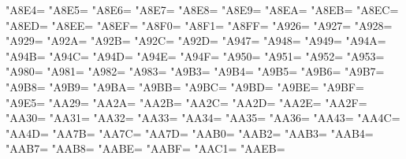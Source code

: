 \XeTeXcharclass"A8E4=\KclassCM
\XeTeXcharclass"A8E5=\KclassCM
\XeTeXcharclass"A8E6=\KclassCM
\XeTeXcharclass"A8E7=\KclassCM
\XeTeXcharclass"A8E8=\KclassCM
\XeTeXcharclass"A8E9=\KclassCM
\XeTeXcharclass"A8EA=\KclassCM
\XeTeXcharclass"A8EB=\KclassCM
\XeTeXcharclass"A8EC=\KclassCM
\XeTeXcharclass"A8ED=\KclassCM
\XeTeXcharclass"A8EE=\KclassCM
\XeTeXcharclass"A8EF=\KclassCM
\XeTeXcharclass"A8F0=\KclassCM
\XeTeXcharclass"A8F1=\KclassCM
\XeTeXcharclass"A8FF=\KclassCM
\XeTeXcharclass"A926=\KclassCM
\XeTeXcharclass"A927=\KclassCM
\XeTeXcharclass"A928=\KclassCM
\XeTeXcharclass"A929=\KclassCM
\XeTeXcharclass"A92A=\KclassCM
\XeTeXcharclass"A92B=\KclassCM
\XeTeXcharclass"A92C=\KclassCM
\XeTeXcharclass"A92D=\KclassCM
\XeTeXcharclass"A947=\KclassCM
\XeTeXcharclass"A948=\KclassCM
\XeTeXcharclass"A949=\KclassCM
\XeTeXcharclass"A94A=\KclassCM
\XeTeXcharclass"A94B=\KclassCM
\XeTeXcharclass"A94C=\KclassCM
\XeTeXcharclass"A94D=\KclassCM
\XeTeXcharclass"A94E=\KclassCM
\XeTeXcharclass"A94F=\KclassCM
\XeTeXcharclass"A950=\KclassCM
\XeTeXcharclass"A951=\KclassCM
\XeTeXcharclass"A952=\KclassCM
\XeTeXcharclass"A953=\KclassCM
\XeTeXcharclass"A980=\KclassCM
\XeTeXcharclass"A981=\KclassCM
\XeTeXcharclass"A982=\KclassCM
\XeTeXcharclass"A983=\KclassCM
\XeTeXcharclass"A9B3=\KclassCM
\XeTeXcharclass"A9B4=\KclassCM
\XeTeXcharclass"A9B5=\KclassCM
\XeTeXcharclass"A9B6=\KclassCM
\XeTeXcharclass"A9B7=\KclassCM
\XeTeXcharclass"A9B8=\KclassCM
\XeTeXcharclass"A9B9=\KclassCM
\XeTeXcharclass"A9BA=\KclassCM
\XeTeXcharclass"A9BB=\KclassCM
\XeTeXcharclass"A9BC=\KclassCM
\XeTeXcharclass"A9BD=\KclassCM
\XeTeXcharclass"A9BE=\KclassCM
\XeTeXcharclass"A9BF=\KclassCM
\XeTeXcharclass"A9E5=\KclassCM
\XeTeXcharclass"AA29=\KclassCM
\XeTeXcharclass"AA2A=\KclassCM
\XeTeXcharclass"AA2B=\KclassCM
\XeTeXcharclass"AA2C=\KclassCM
\XeTeXcharclass"AA2D=\KclassCM
\XeTeXcharclass"AA2E=\KclassCM
\XeTeXcharclass"AA2F=\KclassCM
\XeTeXcharclass"AA30=\KclassCM
\XeTeXcharclass"AA31=\KclassCM
\XeTeXcharclass"AA32=\KclassCM
\XeTeXcharclass"AA33=\KclassCM
\XeTeXcharclass"AA34=\KclassCM
\XeTeXcharclass"AA35=\KclassCM
\XeTeXcharclass"AA36=\KclassCM
\XeTeXcharclass"AA43=\KclassCM
\XeTeXcharclass"AA4C=\KclassCM
\XeTeXcharclass"AA4D=\KclassCM
\XeTeXcharclass"AA7B=\KclassCM
\XeTeXcharclass"AA7C=\KclassCM
\XeTeXcharclass"AA7D=\KclassCM
\XeTeXcharclass"AAB0=\KclassCM
\XeTeXcharclass"AAB2=\KclassCM
\XeTeXcharclass"AAB3=\KclassCM
\XeTeXcharclass"AAB4=\KclassCM
\XeTeXcharclass"AAB7=\KclassCM
\XeTeXcharclass"AAB8=\KclassCM
\XeTeXcharclass"AABE=\KclassCM
\XeTeXcharclass"AABF=\KclassCM
\XeTeXcharclass"AAC1=\KclassCM
\XeTeXcharclass"AAEB=\KclassCM
